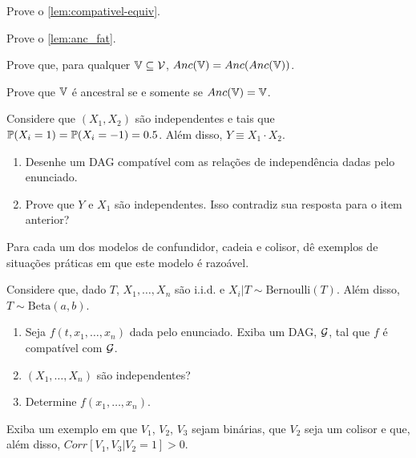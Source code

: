 \begin{exercise}
 Prove o \cref{lem:compativel-equiv}.
\end{exercise}

\begin{exercise}
 Prove o \cref{lem:anc_fat}.
\end{exercise}

\begin{exercise}
 Prove que, para qualquer $\V \subseteq \sV$,
 $Anc(\V) = Anc(Anc(\V))$.
\end{exercise}

\begin{exercise}
 Prove que $\V$ é ancestral se e somente se
 $Anc(\V) = \V$.
\end{exercise}

\begin{exercise}
 Considere que $(X_1,X_2)$ são independentes e
 tais que $\P(X_i=1)=\P(X_i=-1)=0.5$.
 Além disso, $Y \equiv X_1 \cdot X_2$.
 \begin{enumerate}[label=(\alph*)]
  \item Desenhe um DAG compatível
  com as relações de independência dadas pelo enunciado.
  \item Prove que $Y$ e $X_1$ são independentes.
  Isso contradiz sua resposta para o item anterior?
 \end{enumerate}
\end{exercise}

\begin{exercise}
 Para cada um dos modelos de confundidor, cadeia e colisor,
 dê exemplos de situações práticas em que este modelo é razoável.
\end{exercise}

\begin{exercise}
 Considere que, dado $T$, $X_1,\ldots,X_n$ são i.i.d. e
 $X_i|T \sim \text{Bernoulli}(T)$. Além disso,
 $T \sim \text{Beta}(a,b)$.
 \begin{enumerate}[label=(\alph*)]
  \item Seja $f(t,x_1,\ldots,x_n)$ dada pelo enunciado.
  Exiba um DAG, $\sG$, tal que $f$ é compatível com $\sG$.
  \item $(X_1,\ldots,X_n)$ são independentes?
  \item Determine $f(x_1,\ldots,x_n)$.
 \end{enumerate}
\end{exercise}

\begin{exercise}
 Exiba um exemplo em que $V_1$, $V_2$, $V_3$ sejam binárias,
 que $V_2$ seja um colisor e que, além disso,
 $Corr[V_1,V_3|V_2=1] > 0$.
\end{exercise}

